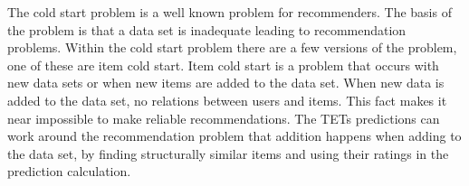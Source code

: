 The cold start problem is a well known problem for recommenders\cite{Ricci2015}\cite{saveski2014item}.
The basis of the problem is that a data set is 
inadequate leading to recommendation problems.
Within the cold start problem there are a few versions of the problem, one of these are item cold start.
Item cold start is a problem that occurs with new data sets or when new items are added to the data set.
When new data is added to the data set, no relations between users and items.
This fact makes it near impossible to make reliable recommendations.
The TETs predictions can work around the recommendation problem that addition happens when adding to the data set, by finding structurally similar items and using their ratings in the prediction calculation.
